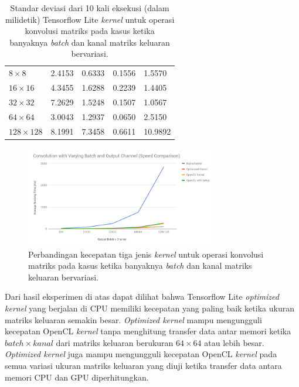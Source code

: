 \begin{table}
	\centering
	\caption{Standar deviasi dari 10 kali eksekusi (dalam milidetik) Tensorflow Lite \textit{kernel} untuk operasi konvolusi matriks pada kasus ketika banyaknya \textit{batch} dan kanal matriks keluaran bervariasi.}
	\label{tab:convvarbchndev}
\begin{tabular}{|>{\small}R{2.5cm}|>{\small}R{2.1cm}|>{\small}R{2.1cm}|>{\small}R{2.1cm}|>{\small}R{2.4cm}|}
	\hline
	 & 
	 & 
	 & 
	 & 
	 \\
	\hline
		$8 \times 8$ & 2.4153 & 0.6333 & 0.1556 & 1.5570
		\\
		\hline
		$16 \times 16$ & 4.3455 & 1.6288 & 0.2239 & 1.4405
		\\
		\hline
		$32 \times 32$ & 7.2629 & 1.5248 & 0.1507 & 1.0567
		\\
		\hline
		$64 \times 64$ & 3.0043 & 1.2937 & 0.0650 & 2.5150
		\\
		\hline
		$128 \times 128$ & 8.1991 & 7.3458 & 0.6611 & 10.9892
		\\
		\hline
	\end{tabular}
\end{table}

\begin{figure}
	\centering
	\includegraphics[width=0.75\textwidth]
	{pics/convvarbchn.png}
	\caption{Perbandingan kecepatan tiga jenis \textit{kernel} untuk operasi konvolusi matriks pada kasus ketika banyaknya \textit{batch} dan kanal matriks keluaran bervariasi.}
	\label{fig:convvarbchn}
\end{figure}

Dari hasil eksperimen di atas dapat dilihat bahwa Tensorflow Lite \textit{optimized kernel} yang berjalan di CPU memiliki kecepatan yang paling baik ketika ukuran matriks keluaran semakin besar. \textit{Optimized kernel} mampu mengungguli kecepatan OpenCL \textit{kernel} tanpa menghitung transfer data antar memori ketika $batch \times kanal$ dari matriks keluaran berukuran $64 \times 64$ atau lebih besar. \textit{Optimized kernel} juga mampu mengungguli kecepatan OpenCL \textit{kernel} pada semua variasi ukuran matriks keluaran yang diuji ketika transfer data antara memori CPU dan GPU diperhitungkan.

